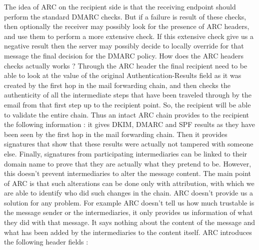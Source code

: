 The idea of ARC on the recipient side is that the receiving endpoint should perform the standard DMARC checks. But if a failure is result of these checks, then optionally the receiver may possibly look for the presence of ARC headers, and use them to perform a more extensive check. If this extensive check give us a negative result then the server may possibly decide to locally override for that message the final decision for the DMARC policy. How does the ARC headers checks actually works ? Through the ARC header the final recipient need to be able to look at the value of the original Authentication-Results field as it was created by the first hop in the mail forwarding chain, and then checks the authenticity of all the intermediate steps that have been traveled through by the email from that first step up to the recipient point. So, the recipient will be able to validate the entire chain. Thus an intact ARC chain provides to the recipient the following information : it gives DKIM, DMARC and SPF results as they have been seen by the first hop in the mail forwarding chain. Then it provides signatures that show that these results were actually not tampered with someone else. Finally, signatures from participating intermediaries can be linked to their domain name to prove that they are actually what they pretend to be. However, this doesn't prevent intermediaries to alter the message content. The main point of ARC is that such alterations can be done only with attribution, with which we are able to identify who did such changes in the chain. ARC doesn't provide us a solution for any problem. For example ARC doesn't tell us how much trustable is the message sender or the intermediaries, it only provides us information of what they did with that message. It says nothing about the content of the message and what has been added by the intermediaries to the content itself. ARC introduces the following header fields :
